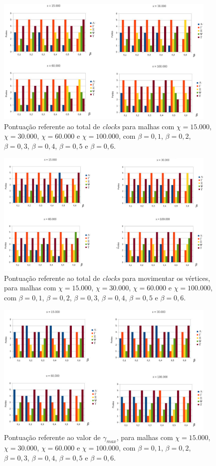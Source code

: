 \begin{figure}[!ht]
  \centering
  \includegraphics[width=300pt]{imagens_resultados/total_clocks.png}
  \caption{\footnotesize{Pontuação referente ao total de {\it clocks} para malhas com $\chi = 15.000$, $\chi = 30.000$, $\chi = 60.000$ e $\chi = 100.000$, com $\beta = 0,1$, $\beta = 0,2$, $\beta = 0,3$, $\beta = 0,4$, $\beta = 0,5$ e $\beta = 0,6$.
   \label{grafico_total_clocks}
}}
\end{figure}

\begin{figure}[!ht]
  \centering
  \includegraphics[width=300pt]{imagens_resultados/clocks_mov.png}
  \caption{\footnotesize{Pontuação referente ao total de {\it clocks} para movimentar os vértices, para malhas com $\chi = 15.000$, $\chi = 30.000$, $\chi = 60.000$ e $\chi = 100.000$, com $\beta = 0,1$, $\beta = 0,2$, $\beta = 0,3$, $\beta = 0,4$, $\beta = 0,5$ e $\beta = 0,6$.
   \label{grafico_total_mov}
}}
\end{figure}

\begin{figure}[!ht]
  \centering
  \includegraphics[width=300pt]{imagens_resultados/gamma_max.png}
  \caption{\footnotesize{Pontuação referente ao valor de $\gamma_{max}$, para malhas com $\chi = 15.000$, $\chi = 30.000$, $\chi = 60.000$ e $\chi = 100.000$, com $\beta = 0,1$, $\beta = 0,2$, $\beta = 0,3$, $\beta = 0,4$, $\beta = 0,5$ e $\beta = 0,6$.
   \label{grafico_gamma_max}
}}
\end{figure}

